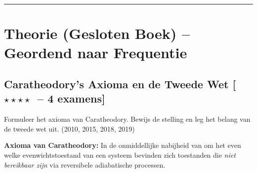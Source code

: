 \documentclass[10pt,a4paper]{article}
\begin{document}
\vspace{2mm}
\noindent\textcolor{headerbg}{\rule{\linewidth}{1pt}}

\section{Theorie (Gesloten Boek) -- Geordend naar Frequentie}

\subsection{Caratheodory's Axioma en de Tweede Wet \textnormal{\color{warningred}[$\star\star\star\star$\ -- 4 examens]}}

\begin{theorievraag}{Formuleer het axioma van Caratheodory. Bewijs de stelling en leg het belang van de tweede wet uit. \textnormal{(2010, 2015, 2018, 2019)}}

\textbf{Axioma van Caratheodory:}
In de onmiddellijke nabijheid van om het even welke evenwichtstoestand van een systeem bevinden zich toestanden die \emph{niet bereikbaar zijn} via reversibele adiabatische processen.

\end{theorievraag}
\end{document}
